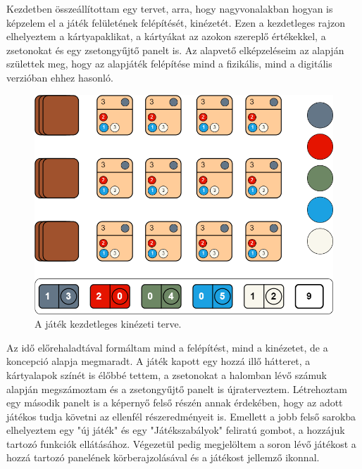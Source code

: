 

Kezdetben összeállítottam egy tervet, arra, hogy nagyvonalakban hogyan is képzelem el a játék felületének felépítését, kinézetét. Ezen a kezdetleges rajzon elhelyeztem a kártyapaklikat, a kártyákat az azokon szereplő értékekkel, a zsetonokat és egy zsetongyűjtő panelt is. Az alapvető elképzeléseim az alapján születtek meg, hogy az alapjáték felépítése mind a fizikális, mind a digitális verzióban ehhez hasonló.

\begin{figure}[h]
\centering
\includegraphics[scale=0.37]{images/screen_structure_plan.png}
\caption{A játék kezdetleges kinézeti terve.}
\label{fig:screen_structure_plan}
\end{figure}


Az idő előrehaladtával formáltam mind a felépítést, mind a kinézetet, de a koncepció alapja megmaradt. A játék kapott egy hozzá illő hátteret, a kártyalapok színét is élőbbé tettem, a zsetonokat a halomban lévő számuk alapján megszámoztam és a zsetongyűjtő panelt is újraterveztem. Létrehoztam egy második panelt is a képernyő felső részén annak érdekében, hogy az adott játékos tudja követni az ellenfél részeredményeit is.
Emellett a jobb felső sarokba elhelyeztem egy "új játék" és egy "Játékszabályok" feliratú gombot, a hozzájuk tartozó funkciók ellátásához. Végezetül pedig megjelöltem a soron lévő játékost a hozzá tartozó panelének körberajzolásával és a játékost jellemző ikonnal.

